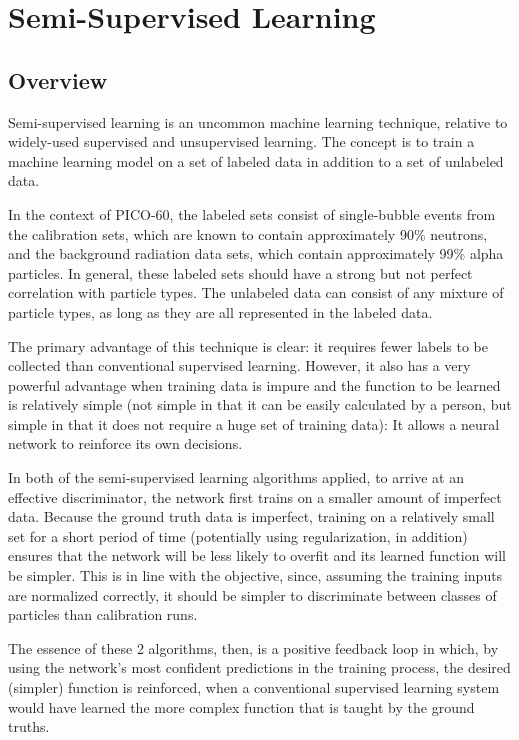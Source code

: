 \documentclass[10pt]{article}
\begin{document}
\section{Semi-Supervised Learning} \label{semi_supervised}

\subsection{Overview}

Semi-supervised learning is an uncommon machine learning technique, relative to widely-used supervised and unsupervised learning. The concept is to train a machine learning model on a set of labeled data in addition to a set of unlabeled data.

In the context of PICO-60, the labeled sets consist of single-bubble events from the calibration sets, which are known to contain approximately 90\% neutrons, and the background radiation data sets, which contain approximately 99\% alpha particles. In general, these labeled sets should have a strong but not perfect correlation with particle types. The unlabeled data can consist of any mixture of particle types, as long as they are all represented in the labeled data.

The primary advantage of this technique is clear: it requires fewer labels to be collected than conventional supervised learning. However, it also has a very powerful advantage when training data is impure and the function to be learned is relatively simple (not simple in that it can be easily calculated by a person, but simple in that it does not require a huge set of training data): It allows a neural network to reinforce its own decisions.

In both of the semi-supervised learning algorithms applied, to arrive at an effective discriminator, the network first trains on a smaller amount of imperfect data. Because the ground truth data is imperfect, training on a relatively small set for a short period of time (potentially using regularization, in addition) ensures that the network will be less likely to overfit and its learned function will be simpler. This is in line with the objective, since, assuming the training inputs are normalized correctly, it should be simpler to discriminate between classes of particles than calibration runs.

The essence of these 2 algorithms, then, is a positive feedback loop in which, by using the network's most confident predictions in the training process, the desired (simpler) function is reinforced, when a conventional supervised learning system would have learned the more complex function that is taught by the ground truths.
\end{document}
